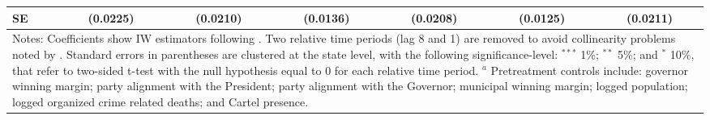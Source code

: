 \begin{landscape}
\begin{table}[htbp]
{\begin{tabular}{lcccccc}
SE       & (0.0225)  & (0.0210) & (0.0136)  & (0.0208)  & (0.0125)  & (0.0211)   \\
\hline \hline
\multicolumn{7}{p{1.3\textwidth}}{\footnotesize{Notes: Coefficients show IW estimators following \citet{abraham_sun_2020}. Two relative time periods (lag 8 and 1) are removed to avoid collinearity problems noted by \citet{abraham_sun_2020}. Standard errors in parentheses are clustered at the state level, with the following significance-level: $^{***}$ 1\%; $^{**}$ 5\%; and $^*$ 10\%, that refer to two-sided t-test with the null hypothesis equal to 0 for each relative time period. $^a$ Pretreatment controls include: governor winning margin; party alignment with the President;  party alignment with the Governor; municipal winning margin; logged population; logged organized crime related deaths; and Cartel presence.}} \\
\end{tabular}
}
\end{table}
\end{landscape}
